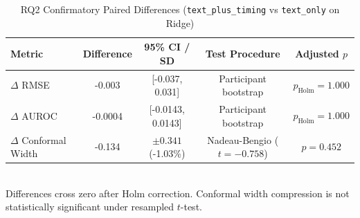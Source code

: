 \begin{table}[t]
\centering
\small
\caption{RQ2 Confirmatory Paired Differences (\texttt{text\_plus\_timing} vs \texttt{text\_only} on Ridge)}
\label{tab:rq2_paired}
\begin{tabular}{lcccc}
\toprule
\textbf{Metric} & \textbf{Difference} & \textbf{95\% CI / SD} & \textbf{Test Procedure} & \textbf{Adjusted $p$} \\
\midrule
$\Delta$ RMSE & -0.003 & [-0.037, 0.031] & Participant bootstrap & $p_{\text{Holm}} = 1.000$ \\
$\Delta$ AUROC & -0.0004 & [-0.0143, 0.0143] & Participant bootstrap & $p_{\text{Holm}} = 1.000$ \\
$\Delta$ Conformal Width & -0.134 & $\pm 0.341$ (-1.03\%) & Nadeau-Bengio ($t=-0.758$) & $p = 0.452$ \\
\bottomrule
\end{tabular}
\\[2pt]
\footnotesize{Differences cross zero after Holm correction. Conformal width compression is not statistically significant under resampled $t$-test.}
\end{table}
